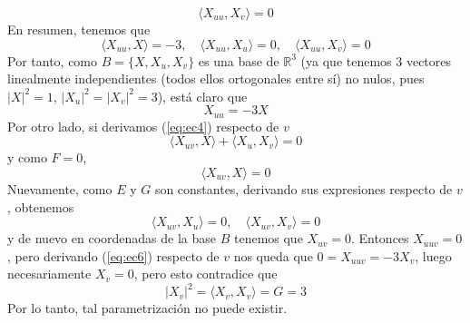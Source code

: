 \documentclass[12pt]{article}
\newcommand{\R}{\mathbb{R}}
\newcommand{\prodesc}[2]{\langle #1, #2 \rangle}
\begin{document}
\begin{ejercicio}
\begin{enumerate}
$$            \prodesc{X_{uu}}{X_v} = 0$$
            En resumen, tenemos que
            $$\prodesc{X_{uu}}{X} = -3, \quad \prodesc{X_{uu}}{X_u} = 0, \quad \prodesc{X_{uu}}{X_{v}} = 0$$
            Por tanto, como $B = \{X, X_u, X_v\}$ es una base de $\R^3$ (ya que tenemos 3 vectores linealmente independientes
            (todos ellos ortogonales entre sí) no nulos, pues $|X|^2 = 1$, $|X_u|^2 = |X_v|^2 = 3$), está claro que
            \begin{equation}\label{eq:ec6}
                X_{uu} = -3X
            \end{equation}
            Por otro lado, si derivamos (\ref{eq:ec4}) respecto de $v$
            $$\prodesc{X_{uv}}{X} + \prodesc{X_u}{X_v} = 0$$
            y como $F=0$,
            $$\prodesc{X_{uv}}{X} = 0$$
            Nuevamente, como $E$ y $G$ son constantes, derivando sus expresiones respecto de $v$, obtenemos
            $$\prodesc{X_{uv}}{X_u} = 0, \quad \prodesc{X_{uv}}{X_v} = 0$$
            y de nuevo en coordenadas de la base $B$ tenemos que $X_{uv} = 0$. Entonces $X_{uuv} = 0$, pero derivando (\ref{eq:ec6})
            respecto de $v$ nos queda que $0 = X_{uuv} = -3 X_v$, luego necesariamente $X_v = 0$, pero esto contradice que
            $$|X_v|^2 = \prodesc{X_v}{X_v} = G = 3$$
            Por lo tanto, tal parametrización no puede existir.
        \end{enumerate}
    \end{ejercicio}
\end{document}
